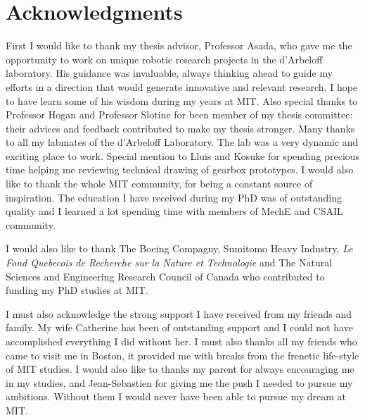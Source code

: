 \section*{Acknowledgments}


First I would like to thank my thesis advisor, Professor Asada, who gave me the opportunity to work on unique robotic research projects in the d'Arbeloff laboratory. His guidance was invaluable, always thinking ahead to guide my efforts in a direction that would generate innovative and relevant research. I hope to have learn some of his wisdom during my years at MIT. Also special thanks to Professor Hogan and Professor Slotine for been member of my thesis committee: their advices and feedback contributed to make my thesis stronger. Many thanks to all my labmates of the d'Arbeloff Laboratory. The lab was a very dynamic and exciting place to work. Special mention to Lluis and Kosuke for spending precious time helping me reviewing technical drawing of gearbox prototypes. I would also like to thank the whole MIT community, for being a constant source of inspiration. The education I have received during my PhD was of outstanding quality and I learned a lot spending time with members of MechE and CSAIL community.

I would also like to thank The Boeing Compagny, Sumitomo Heavy Industry, \textit{Le Fond Quebecois de Recherche sur la Nature et Technologie} and The Natural Sciences and Engineering Research Council of Canada who contributed to funding my PhD studies at MIT.

I must also acknowledge the strong support I have received from my friends and family. My wife Catherine has been of outstanding support and I could not have accomplished everything I did without her. I must also thanks all my friends who came to visit me in Boston, it provided me with breaks from the frenetic life-style of MIT studies. I would also like to thanks my parent for always encouraging me in my studies, and Jean-Sebastien for giving me the push I needed to pursue my ambitions. Without them I would never have been able to pursue my dream at MIT. 
